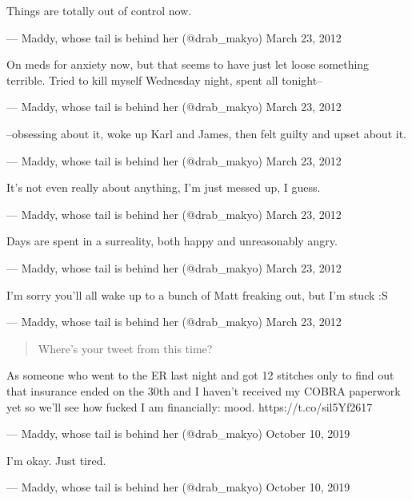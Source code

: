 Things are totally out of control now.

--- Maddy, whose tail is behind her (@drab\_makyo) March 23, 2012

On meds for anxiety now, but that seems to have just let loose something terrible. Tried to kill myself Wednesday night, spent all tonight--

--- Maddy, whose tail is behind her (@drab\_makyo) March 23, 2012

--obsessing about it, woke up Karl and James, then felt guilty and upset about it.

--- Maddy, whose tail is behind her (@drab\_makyo) March 23, 2012

It's not even really about anything, I'm just messed up, I guess.

--- Maddy, whose tail is behind her (@drab\_makyo) March 23, 2012

Days are spent in a surreality, both happy and unreasonably angry.

--- Maddy, whose tail is behind her (@drab\_makyo) March 23, 2012

I'm sorry you'll all wake up to a bunch of Matt freaking out, but I'm stuck :S

--- Maddy, whose tail is behind her (@drab\_makyo) March 23, 2012

\begin{quote}
Where's your tweet from this time?
\end{quote}

As someone who went to the ER last night and got 12 stitches only to find out that insurance ended on the 30th and I haven't received my COBRA paperwork yet so we'll see how fucked I am financially: mood. https://t.co/sil5Yf2617

--- Maddy, whose tail is behind her (@drab\_makyo) October 10, 2019

I'm okay. Just tired.

--- Maddy, whose tail is behind her (@drab\_makyo) October 10, 2019
